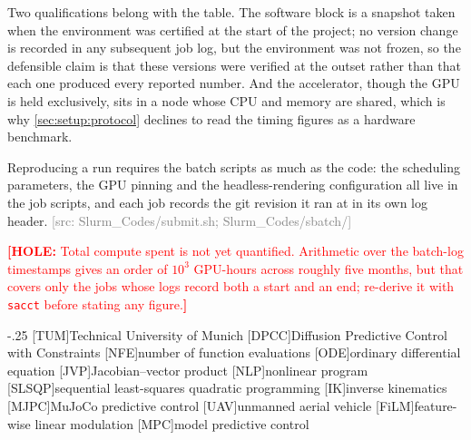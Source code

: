 \documentclass[headsepline,footsepline,footinclude=false,oneside,fontsize=11pt,paper=a4,listof=totoc,bibliography=totoc]{scrbook}
\theoremstyle{definition}
\theoremstyle{plain}
\theoremstyle{remark}
\newif\ifsubmission
\newcommand{\hole}[1]{\ifsubmission\GenericWarning{}{Thesis: a HOLE is left in the submitted build}\fi%
  \textcolor{red}{\textbf{[HOLE:} #1\textbf{]}}}
\newcommand{\srcnote}[1]{\ifsubmission\else\textcolor{gray}{\footnotesize\textsf{[src: #1]}}\fi}
\begin{document}
Two qualifications belong with the table. The software block is a snapshot taken when the
environment was certified at the start of the project; no version change is recorded in any
subsequent job log, but the environment was not frozen, so the defensible claim is that these
versions were verified at the outset rather than that each one produced every reported number.
And the accelerator, though the GPU is held exclusively, sits in a node whose CPU and memory are
shared, which is why \autoref{sec:setup:protocol} declines to read the timing figures as a hardware
benchmark.

Reproducing a run requires the batch scripts as much as the code: the scheduling parameters, the
GPU pinning and the headless-rendering configuration all live in the job scripts, and each job
records the git revision it ran at in its own log header.
\srcnote{Slurm\_Codes/submit.sh; Slurm\_Codes/sbatch/}

\hole{Total compute spent is not yet quantified. Arithmetic over the batch-log timestamps gives an
order of $10^{3}$ GPU-hours across roughly five months, but that covers only the jobs whose logs
record both a start and an end; re-derive it with \texttt{sacct} before stating any figure.}


\begin{acronym}
  \itemsep-.25\baselineskip
  [TUM]{Technical University of Munich}
  [DPCC]{Diffusion Predictive Control with Constraints}
  [NFE]{number of function evaluations}
  [ODE]{ordinary differential equation}
  [JVP]{Jacobian--vector product}
  [NLP]{nonlinear program}
  [SLSQP]{sequential least-squares quadratic programming}
  [IK]{inverse kinematics}
  [MJPC]{MuJoCo predictive control}
  [UAV]{unmanned aerial vehicle}
  [FiLM]{feature-wise linear modulation}
  [MPC]{model predictive control}
\end{acronym}

\listoffigures{}
\listoftables{}

\printbibliography{}
\end{document}

